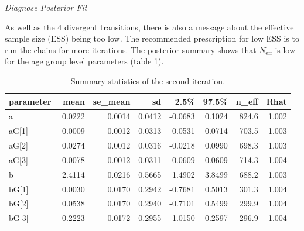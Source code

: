 \documentclass[11pt, oneside, openany]{scrbook}
\newenvironment{Shaded}{\begin{snugshade}}{\end{snugshade}}
\newcommand{\CommentTok}[1]{\textcolor[rgb]{0.56,0.35,0.01}{\textit{#1}}}
\newcommand{\KeywordTok}[1]{\textcolor[rgb]{0.13,0.29,0.53}{\textbf{#1}}}
\newcommand{\NormalTok}[1]{#1}
\begin{document}
\emph{Diagnose Posterior Fit}


\begin{Shaded}
\end{Shaded}


As well as the 4 divergent transitions, there is also a message about the effective sample size (ESS) being too low. The recommended prescription for low ESS is to run the chains for more iterations. The posterior summary shows that \(N_{\mathrm{eff}}\) is low for the age group level parameters (table \ref{tab:ch042-Liquid-Strawberry-Eagle}).

\begin{table}[!h]

\caption{\label{tab:ch042-Liquid-Strawberry-Eagle}Summary statistics of the second iteration.}
\centering
\begin{tabular}[t]{lrrrrrrr}
\toprule
parameter & mean & se\_mean & sd & 2.5\% & 97.5\% & n\_eff & Rhat\\
\midrule
a & 0.0222 & 0.0014 & 0.0412 & -0.0683 & 0.1024 & 824.6 & 1.002\\
aG[1] & -0.0009 & 0.0012 & 0.0313 & -0.0531 & 0.0714 & 703.5 & 1.003\\
aG[2] & 0.0274 & 0.0012 & 0.0316 & -0.0218 & 0.0990 & 698.3 & 1.003\\
aG[3] & -0.0078 & 0.0012 & 0.0311 & -0.0609 & 0.0609 & 714.3 & 1.004\\
b & 2.4114 & 0.0216 & 0.5665 & 1.4902 & 3.8499 & 688.2 & 1.003\\
\addlinespace
bG[1] & 0.0030 & 0.0170 & 0.2942 & -0.7681 & 0.5013 & 301.3 & 1.004\\
bG[2] & 0.0538 & 0.0170 & 0.2940 & -0.7101 & 0.5499 & 299.9 & 1.004\\
bG[3] & -0.2223 & 0.0172 & 0.2955 & -1.0150 & 0.2597 & 296.9 & 1.004\\
\bottomrule
\end{tabular}
\end{table}
\end{document}
